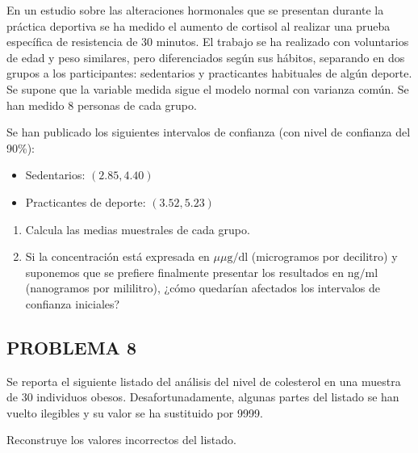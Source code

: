 \documentclass[
]{article}
\newenvironment{Shaded}{\begin{snugshade}}{\end{snugshade}}
\newcommand{\DecValTok}[1]{\textcolor[rgb]{0.00,0.00,0.81}{#1}}
\newcommand{\ErrorTok}[1]{\textcolor[rgb]{0.64,0.00,0.00}{\textbf{#1}}}
\newcommand{\FloatTok}[1]{\textcolor[rgb]{0.00,0.00,0.81}{#1}}
\newcommand{\NormalTok}[1]{#1}
\newcommand{\SpecialCharTok}[1]{\textcolor[rgb]{0.81,0.36,0.00}{\textbf{#1}}}
\providecommand{\tightlist}{%
  \setlength{\itemsep}{0pt}\setlength{\parskip}{0pt}}
\begin{document}
En un estudio sobre las alteraciones hormonales que se presentan durante la práctica deportiva se ha medido el aumento de cortisol al realizar una prueba específica de resistencia de 30 minutos. El trabajo se ha realizado con voluntarios de edad y peso similares, pero diferenciados según sus hábitos, separando en dos grupos a los participantes: sedentarios y practicantes habituales de algún deporte. Se supone que la variable medida sigue el modelo normal con varianza común. Se han medido 8 personas de cada grupo.

Se han publicado los siguientes intervalos de confianza (con nivel de confianza del 90\%):

\begin{itemize}
\tightlist
\item
  Sedentarios: \((2.85,4.40)\)\\
\item
  Practicantes de deporte: \((3.52,5.23)\)
\end{itemize}

\begin{enumerate}
\def\labelenumi{\alph{enumi})}
\tightlist
\item
  Calcula las medias muestrales de cada grupo.\\
\item
  Si la concentración está expresada en \(\mu \mu \mathrm{g} / \mathrm{dl}\) (microgramos por decilitro) y suponemos que se prefiere finalmente presentar los resultados en \(\mathrm{ng} / \mathrm{ml}\) (nanogramos por mililitro), ¿cómo quedarían afectados los intervalos de confianza iniciales?
\end{enumerate}

\subsection{PROBLEMA 8}\label{problema-8}

Se reporta el siguiente listado del análisis del nivel de colesterol en una muestra de 30 individuos obesos. Desafortunadamente, algunas partes del listado se han vuelto ilegibles y su valor se ha sustituido por 9999.

\begin{Shaded}
\end{Shaded}

Reconstruye los valores incorrectos del listado.
\end{document}
